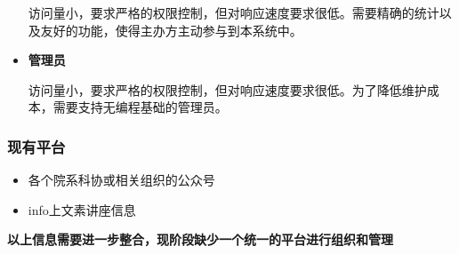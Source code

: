 \documentclass[utf8, a4paper]{beamer}
\begin{document}
\begin{CJK}{UTF8}{gbsn}
\begin{frame}
\begin{itemize}
    访问量小，要求严格的权限控制，但对响应速度要求很低。需要精确的统计以及友好的功能，使得主办方主动参与到本系统中。
  
    \item \textbf{管理员}
  
    访问量小，要求严格的权限控制，但对响应速度要求很低。为了降低维护成本，需要支持无编程基础的管理员。

    \end{itemize}
\end{frame}

\begin{frame}
    \frametitle{现有平台}
  
    \begin{itemize}
    \item 各个院系科协或相关组织的公众号
    \item info上文素讲座信息
    
    

    \end{itemize}
    \par
    \textbf{以上信息需要进一步整合，现阶段缺少一个统一的平台进行组织和管理}
\end{frame}

\end{CJK}
\end{document}
